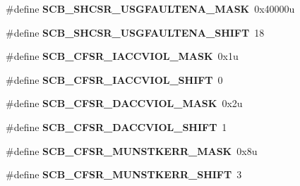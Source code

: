 \begin{DoxyCompactItemize}
\item 
\hypertarget{group___s_c_b___register___masks_ga9ef5790c8bd898e33f9912f71f488057}{}\#define {\bfseries S\+C\+B\+\_\+\+S\+H\+C\+S\+R\+\_\+\+U\+S\+G\+F\+A\+U\+L\+T\+E\+N\+A\+\_\+\+M\+A\+S\+K}~0x40000u\label{group___s_c_b___register___masks_ga9ef5790c8bd898e33f9912f71f488057}

\item 
\hypertarget{group___s_c_b___register___masks_ga597bef62e8432e59ba7c7770bcdba356}{}\#define {\bfseries S\+C\+B\+\_\+\+S\+H\+C\+S\+R\+\_\+\+U\+S\+G\+F\+A\+U\+L\+T\+E\+N\+A\+\_\+\+S\+H\+I\+F\+T}~18\label{group___s_c_b___register___masks_ga597bef62e8432e59ba7c7770bcdba356}

\item 
\hypertarget{group___s_c_b___register___masks_gac06ff8fa6bf1e32ddf18b6b131ba6e2b}{}\#define {\bfseries S\+C\+B\+\_\+\+C\+F\+S\+R\+\_\+\+I\+A\+C\+C\+V\+I\+O\+L\+\_\+\+M\+A\+S\+K}~0x1u\label{group___s_c_b___register___masks_gac06ff8fa6bf1e32ddf18b6b131ba6e2b}

\item 
\hypertarget{group___s_c_b___register___masks_ga721581c019dbeb8dd2a9879e17bbcf05}{}\#define {\bfseries S\+C\+B\+\_\+\+C\+F\+S\+R\+\_\+\+I\+A\+C\+C\+V\+I\+O\+L\+\_\+\+S\+H\+I\+F\+T}~0\label{group___s_c_b___register___masks_ga721581c019dbeb8dd2a9879e17bbcf05}

\item 
\hypertarget{group___s_c_b___register___masks_ga9984c3895b7b6584f1c0907bc0fa65f8}{}\#define {\bfseries S\+C\+B\+\_\+\+C\+F\+S\+R\+\_\+\+D\+A\+C\+C\+V\+I\+O\+L\+\_\+\+M\+A\+S\+K}~0x2u\label{group___s_c_b___register___masks_ga9984c3895b7b6584f1c0907bc0fa65f8}

\item 
\hypertarget{group___s_c_b___register___masks_gad841ce29e85066f38861d1c3fc338096}{}\#define {\bfseries S\+C\+B\+\_\+\+C\+F\+S\+R\+\_\+\+D\+A\+C\+C\+V\+I\+O\+L\+\_\+\+S\+H\+I\+F\+T}~1\label{group___s_c_b___register___masks_gad841ce29e85066f38861d1c3fc338096}

\item 
\hypertarget{group___s_c_b___register___masks_gab0a1c87894f374e1d3d1ae7526bab605}{}\#define {\bfseries S\+C\+B\+\_\+\+C\+F\+S\+R\+\_\+\+M\+U\+N\+S\+T\+K\+E\+R\+R\+\_\+\+M\+A\+S\+K}~0x8u\label{group___s_c_b___register___masks_gab0a1c87894f374e1d3d1ae7526bab605}

\item 
\hypertarget{group___s_c_b___register___masks_ga0127072fbe7085d0eb068fe7790f1641}{}\#define {\bfseries S\+C\+B\+\_\+\+C\+F\+S\+R\+\_\+\+M\+U\+N\+S\+T\+K\+E\+R\+R\+\_\+\+S\+H\+I\+F\+T}~3\label{group___s_c_b___register___masks_ga0127072fbe7085d0eb068fe7790f1641}


\end{DoxyCompactItemize}
